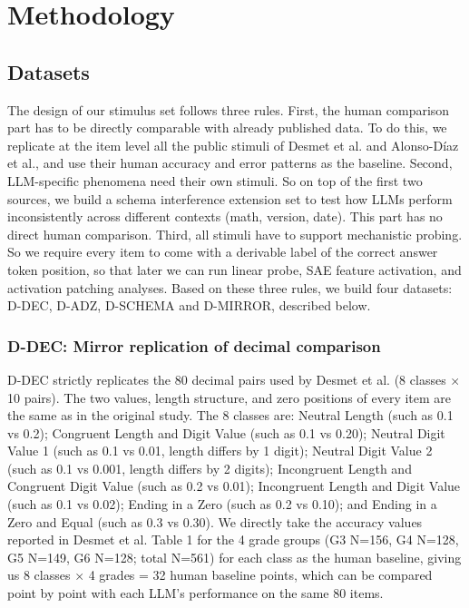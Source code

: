\cleardoublepage

\section{Methodology}

\subsection{Datasets}

The design of our stimulus set follows three rules. First, the human comparison part has to be directly comparable with already published data. To do this, we replicate at the item level all the public stimuli of Desmet et al.\cite{desmet2010} and Alonso-Díaz et al.\cite{alonsodaz2018}, and use their human accuracy and error patterns as the baseline. Second, LLM-specific phenomena need their own stimuli. So on top of the first two sources, we build a schema interference extension set to test how LLMs perform inconsistently across different contexts (math, version, date). This part has no direct human comparison. Third, all stimuli have to support mechanistic probing. So we require every item to come with a derivable label of the correct answer token position, so that later we can run linear probe, SAE feature activation, and activation patching analyses. Based on these three rules, we build four datasets: D-DEC, D-ADZ, D-SCHEMA and D-MIRROR, described below.

\subsubsection{D-DEC: Mirror replication of decimal comparison}

D-DEC strictly replicates the 80 decimal pairs used by Desmet et al.\cite{desmet2010} (8 classes × 10 pairs). The two values, length structure, and zero positions of every item are the same as in the original study. The 8 classes are: Neutral Length (such as 0.1 vs 0.2); Congruent Length and Digit Value (such as 0.1 vs 0.20); Neutral Digit Value 1 (such as 0.1 vs 0.01, length differs by 1 digit); Neutral Digit Value 2 (such as 0.1 vs 0.001, length differs by 2 digits); Incongruent Length and Congruent Digit Value (such as 0.2 vs 0.01); Incongruent Length and Digit Value (such as 0.1 vs 0.02); Ending in a Zero (such as 0.2 vs 0.10); and Ending in a Zero and Equal (such as 0.3 vs 0.30). We directly take the accuracy values reported in Desmet et al.\cite{desmet2010} Table 1 for the 4 grade groups (G3 N=156, G4 N=128, G5 N=149, G6 N=128; total N=561) for each class as the human baseline, giving us 8 classes × 4 grades = 32 human baseline points, which can be compared point by point with each LLM's performance on the same 80 items.

